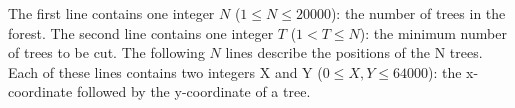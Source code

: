 The first line contains one integer $N$ ($1 \le N \le 20000$): the number of trees in the forest. The second line contains one integer $T$ ($1 < T \le N$): the minimum number of trees to be cut. The following $N$ lines describe the positions of the N trees. Each of these lines contains two integers X and Y ($0 \le X,Y \le 64000$): the x-coordinate followed by the y-coordinate of a tree. 